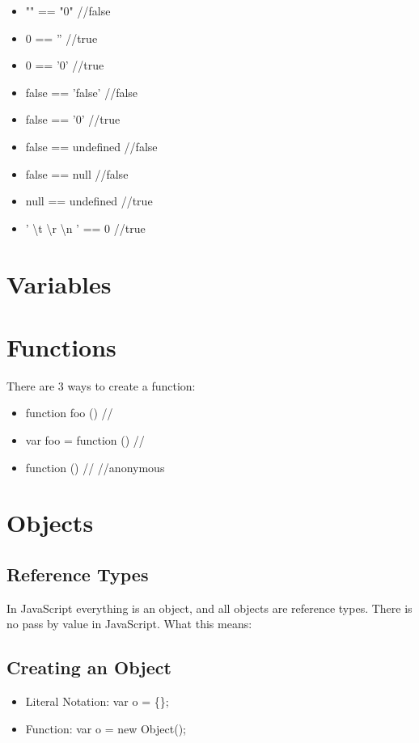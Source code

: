 \documentclass {article}
\begin{document}
		\begin{itemize}
			\item "" == "0" //false
			\item 0 == '' //true
			\item 0 == '0' //true
		\end{itemize}

		\begin{itemize}
			\item false == 'false' //false
			\item false == '0' //true
		\end{itemize}

		\begin{itemize}
			\item false == undefined //false
			\item false == null //false
			\item null == undefined //true
			\item ' \textbackslash{t} \textbackslash{r} \textbackslash{n} ' == 0 //true
		\end{itemize}

\section{Variables}

\section{Functions}
	There are 3 ways to create a function: 
	\begin{itemize}
		\item function foo () /{/}
		\item var foo = function () /{/}
		\item function () /{/} //anonymous
	\end{itemize}



\section{Objects}
	\subsection {Reference Types}
		In JavaScript everything is an object, and all objects are reference types.  There is no pass by value in JavaScript.  
		What this means: 
	
	\subsection{Creating an Object}
		\begin{itemize}
			\item Literal Notation: var o = \{\};
			\item Function: var o = new Object();
		\end{itemize}		
\end{document}
